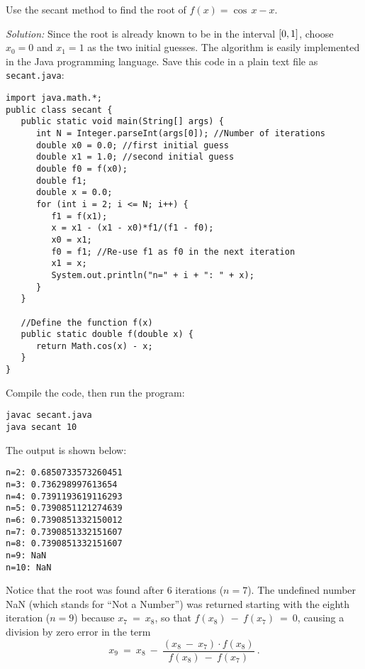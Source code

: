 \begin{exmp}\label{exmp:secant1}
\noindent Use the secant method to find the root of $f(x) = \cos\,x - x$.\vspace{1mm}
\par\noindent\emph{Solution:} Since the root is already known to be in the
interval $\lbrack 0,1 \rbrack$, choose $x_0 = 0$ and $x_1 = 1$ as the two initial guesses.
The algorithm is easily implemented in the Java programming
language. Save this code in a plain text file as \texttt{secant.java}:
\begin{lstlisting}[frame=single,framerule=0pt]
import java.math.*;
public class secant {
   public static void main(String[] args) {
      int N = Integer.parseInt(args[0]); //Number of iterations
      double x0 = 0.0; //first initial guess
      double x1 = 1.0; //second initial guess
      double f0 = f(x0);
      double f1;
      double x = 0.0;
      for (int i = 2; i <= N; i++) {
         f1 = f(x1);
         x = x1 - (x1 - x0)*f1/(f1 - f0);
         x0 = x1;
         f0 = f1; //Re-use f1 as f0 in the next iteration
         x1 = x;
         System.out.println("n=" + i + ": " + x);
      }
   }

   //Define the function f(x)
   public static double f(double x) {
      return Math.cos(x) - x;
   }
}
\end{lstlisting}
\noindent Compile the code, then run the program:
\begin{Verbatim}[frame=single,framesep=3pt]
javac secant.java
java secant 10
\end{Verbatim}
The output is shown below:
\begin{Verbatim}[frame=single,framesep=3pt]
n=2: 0.6850733573260451
n=3: 0.736298997613654
n=4: 0.7391193619116293
n=5: 0.7390851121274639
n=6: 0.7390851332150012
n=7: 0.7390851332151607
n=8: 0.7390851332151607
n=9: NaN
n=10: NaN
\end{Verbatim}
Notice that the root was found after 6 iterations ($n=7$). The undefined number
NaN (which stands for ``Not a Number'') was returned starting
with the eighth iteration ($n=9$) because $x_7 ~=~ x_8$, so that
$f(x_8) ~-~ f(x_7) ~=~ 0$, causing a division by zero error in the term
\begin{displaymath}
 x_9 ~=~ x_8 ~-~ \frac{(x_8 ~-~ x_7) \cdot f(x_8)}{f(x_8) ~-~ f(x_7)} ~.
\end{displaymath}
\end{exmp}\vspace{-2mm}
\divider
\vspace{2mm}

